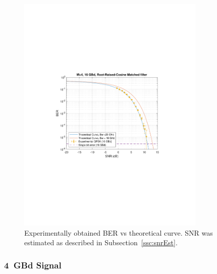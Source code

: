 \begin{refsection}
\begin{figure}[H]
	\centering
	\includegraphics[clip, trim=4cm 8cm 4cm 8cm,
	width=0.8\textwidth]{./sdf/m_qam_system/figures/expResults/homodyne/16GBdBER20180611.pdf}
	\caption{Experimentally obtained BER vs theoretical curve. SNR was estimated as described in Subsection~\ref{ssc:snrEst}.}
	\label{fig:16GBdFinalBERcurveHm}
\end{figure}




\subsubsection{4~GBd Signal}



\end{refsection}
